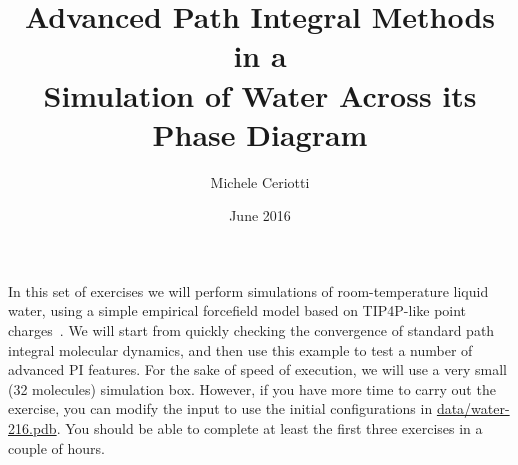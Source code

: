 \documentclass{article}
\title{Advanced Path Integral Methods in a \\ Simulation of Water Across 
  its Phase Diagram}
\author{Michele Ceriotti}
\date{June 2016}
\begin{document}
\maketitle

In this set of exercises we will perform
simulations of room-temperature liquid water,
using a simple empirical forcefield model based
on TIP4P-like point charges~\cite{habe+09jcp}. 
We will start from quickly checking the convergence of 
standard path integral molecular
dynamics, and then use this 
example to test a number of 
advanced PI features. For the sake of 
speed of execution, we will use a very
small (32 molecules) simulation box. 
However, if you have more time to carry
out the exercise, you can modify
the input to use the initial
configurations in \url{data/water-216.pdb}.
You should be able to complete at least the first three
exercises in a couple of hours. 
\end{document}
